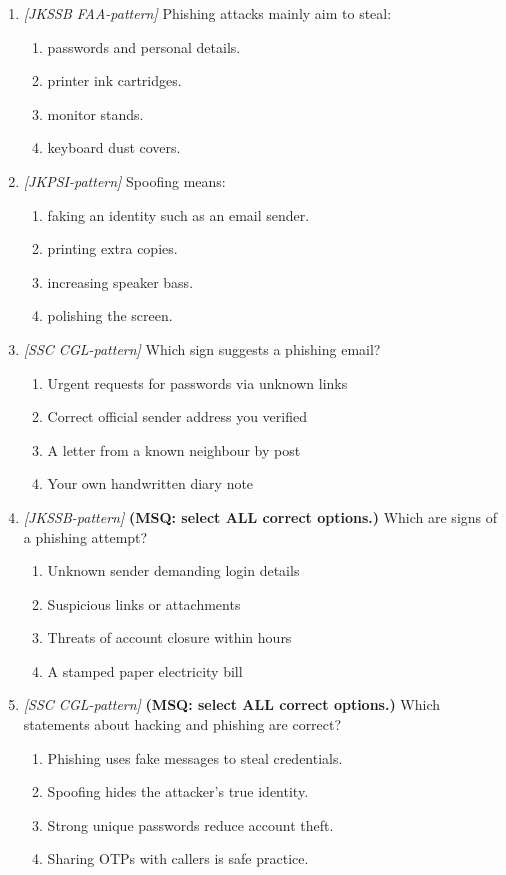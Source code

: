 \documentclass[11pt]{article}
\begin{document}
\begin{enumerate}[label=\textbf{Q\arabic*.}, leftmargin=*]
\item \textit{[JKSSB FAA-pattern]} Phishing attacks mainly aim to steal:
  \begin{enumerate}[label=\Alph*.]
    \item passwords and personal details.
    \item printer ink cartridges.
    \item monitor stands.
    \item keyboard dust covers.
  \end{enumerate}
\item \textit{[JKPSI-pattern]} Spoofing means:
  \begin{enumerate}[label=\Alph*.]
    \item faking an identity such as an email sender.
    \item printing extra copies.
    \item increasing speaker bass.
    \item polishing the screen.
  \end{enumerate}
\item \textit{[SSC CGL-pattern]} Which sign suggests a phishing email?
  \begin{enumerate}[label=\Alph*.]
    \item Urgent requests for passwords via unknown links
    \item Correct official sender address you verified
    \item A letter from a known neighbour by post
    \item Your own handwritten diary note
  \end{enumerate}
\item \textit{[JKSSB-pattern]} \textbf{(MSQ: select ALL correct options.)} Which are signs of a phishing attempt?
  \begin{enumerate}[label=\Alph*.]
    \item Unknown sender demanding login details
    \item Suspicious links or attachments
    \item Threats of account closure within hours
    \item A stamped paper electricity bill
  \end{enumerate}
\item \textit{[SSC CGL-pattern]} \textbf{(MSQ: select ALL correct options.)} Which statements about hacking and phishing are correct?
  \begin{enumerate}[label=\Alph*.]
    \item Phishing uses fake messages to steal credentials.
    \item Spoofing hides the attacker's true identity.
    \item Strong unique passwords reduce account theft.
    \item Sharing OTPs with callers is safe practice.
  \end{enumerate}
\end{enumerate}
\def\JKSSBLessonID{43}\def\JKSSBAnswers{0}
\end{document}
